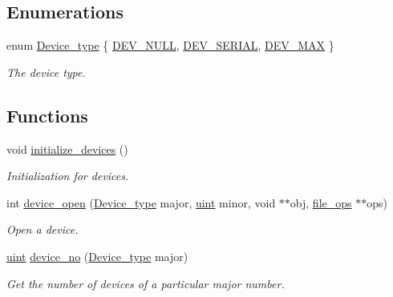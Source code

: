 \subsection*{Enumerations}
\begin{DoxyCompactItemize}
\item 
enum \hyperlink{group__dev_ga879ceac20e83b2375e5b49f4379b0c90}{Device\-\_\-type} \{ \hyperlink{group__dev_gga879ceac20e83b2375e5b49f4379b0c90a8ca9ed7c2fc080b6706582ccf828b08f}{D\-E\-V\-\_\-\-N\-U\-L\-L}, 
\hyperlink{group__dev_gga879ceac20e83b2375e5b49f4379b0c90adb43c91cf279ccd4510abaed9425bacc}{D\-E\-V\-\_\-\-S\-E\-R\-I\-A\-L}, 
\hyperlink{group__dev_gga879ceac20e83b2375e5b49f4379b0c90a4d07dfbc7e68d26e2d92773a37381ce7}{D\-E\-V\-\_\-\-M\-A\-X}
 \}
\begin{DoxyCompactList}\small\item\em The device type. \end{DoxyCompactList}\end{DoxyCompactItemize}
\subsection*{Functions}
\begin{DoxyCompactItemize}
\item 
void \hyperlink{group__dev_ga840b5c2460abea4a19a201f7d6d035c8}{initialize\-\_\-devices} ()
\begin{DoxyCompactList}\small\item\em Initialization for devices. \end{DoxyCompactList}\item 
int \hyperlink{group__dev_ga6d8e08550640c9819aa07b6bba9fa6ed}{device\-\_\-open} (\hyperlink{group__dev_ga879ceac20e83b2375e5b49f4379b0c90}{Device\-\_\-type} major, \hyperlink{bios_8h_a91ad9478d81a7aaf2593e8d9c3d06a14}{uint} minor, void $\ast$$\ast$obj, \hyperlink{group__dev_gaab625d8ae3a95e942ed10ed1579f5042}{file\-\_\-ops} $\ast$$\ast$ops)
\begin{DoxyCompactList}\small\item\em Open a device. \end{DoxyCompactList}\item 
\hyperlink{bios_8h_a91ad9478d81a7aaf2593e8d9c3d06a14}{uint} \hyperlink{group__dev_ga0808cf584a510e0eff6908a5313ce296}{device\-\_\-no} (\hyperlink{group__dev_ga879ceac20e83b2375e5b49f4379b0c90}{Device\-\_\-type} major)
\begin{DoxyCompactList}\small\item\em Get the number of devices of a particular major number. \end{DoxyCompactList}\end{DoxyCompactItemize}


